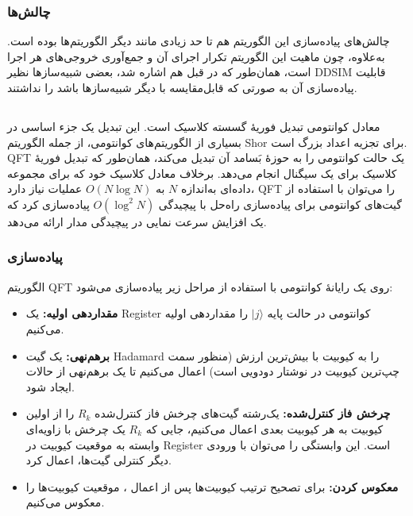 \subsubsection{چالش‌ها}
چالش‌های پیاده‌سازی این الگوریتم هم تا حد زیادی مانند دیگر الگوریتم‌ها بوده است. به‌علاوه، چون ماهیت این الگوریتم تکرار اجرای آن و جمع‌آوری خروجی‌های هر اجرا است، همان‌طور که در قبل هم اشاره شد، بعضی شبیه‌سازها نظیر DDSIM قابلیت پیاده‌سازی آن به صورتی که قابل‌مقایسه با دیگر شبیه‌سازها باشد را نداشتند.
\subsection{}
معادل کوانتومی تبدیل فوریهٔ گسسته کلاسیک است. این تبدیل یک جزء اساسی در بسیاری از الگوریتم‌های کوانتومی، از جمله الگوریتم Shor برای تجزیه اعداد بزرگ است. QFT یک حالت کوانتومی را به حوزهٔ بَسامد آن تبدیل می‌کند، همان‌طور که تبدیل فوریهٔ کلاسیک برای یک سیگنال انجام می‌دهد. برخلاف معادل کلاسیک خود که برای مجموعه داده‌ای به‌اندازه \(N \) به \(O(N \log N) \) عملیات نیاز دارد، QFT را می‌توان با استفاده از گیت‌های کوانتومی برای پیاده‌سازی راه‌حل با پیچیدگی \(O(\log^2 N) \) پیاده‌سازی کرد که یک افزایش سرعت نمایی در پیچیدگی مدار ارائه می‌دهد.
\subsubsection{پیاده‌سازی}
الگوریتم QFT روی یک رایانه‌ٔ کوانتومی با استفاده از مراحل زیر پیاده‌سازی می‌شود:

\begin{itemize}
	\item \textbf{مقداردهی اولیه:}
یک Register کوانتومی در حالت پایه \( \lvert j \rangle \) را مقداردهی اولیه می‌کنیم.
	\item \textbf{برهم‌نهی:}
یک گیت Hadamard را به کیوبیت با بیش‌ترین ارزش (منظور سمت چپ‌ترین کیوبیت در نوشتار دودویی است) اعمال می‌کنیم تا یک برهم‌نهی از حالات ایجاد شود.
	\item \textbf{چرخش فاز کنترل‌شده:}
یک‌رشته گیت‌های چرخش فاز کنترل‌شده \( R_k \) را از اولین کیوبیت به هر کیوبیت بعدی اعمال می‌کنیم، جایی که \( R_k \) یک چرخش با زاویه‌ای وابسته به موقعیت کیوبیت در Register است. این وابستگی را می‌توان با ورودی دیگر کنترلی گیت‌ها، اعمال کرد.
	\item \textbf{معکوس ‌کردن:}
برای تصحیح ترتیب کیوبیت‌ها پس از اعمال ، موقعیت کیوبیت‌ها را معکوس می‌کنیم.
\end{itemize}

